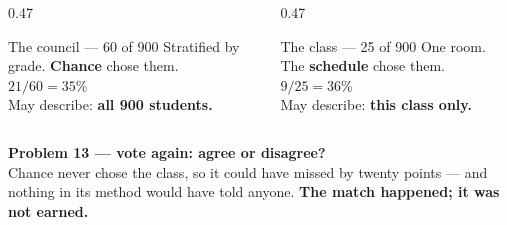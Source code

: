 \documentclass[aspectratio=169, 11pt]{beamer}
\newcommand{\redink}[1]{{\color{redacc}\bfseries #1}}
\begin{document}
\begin{frame}[t, plain]
  \vspace{2pt}
  \begin{columns}[t]
    \begin{column}{0.47\textwidth}
      \begin{block}{The council --- 60 of 900}
        Stratified by grade. \textbf{Chance} chose them. \\[3pt]
        $21/60 = 35\%$ \\[3pt]
        May describe: \textbf{all 900 students.}
      \end{block}
    \end{column}
    \begin{column}{0.47\textwidth}
      \begin{block}{The class --- 25 of 900}
        One room. The \textbf{schedule} chose them. \\[3pt]
        $9/25 = 36\%$ \\[3pt]
        May describe: \redink{this class only.}
      \end{block}
    \end{column}
  \end{columns}
  \vspace{8pt}
  \begin{center}
    {\large \textbf{Problem 13 --- vote again: agree or disagree?}}\\[5pt]
    {\small\color{slate} Chance never chose the class, so it could have missed by twenty points
    --- and nothing in its method would have told anyone. \textbf{The match happened; it was not
    earned.}}
  \end{center}
\end{frame}
\end{document}
